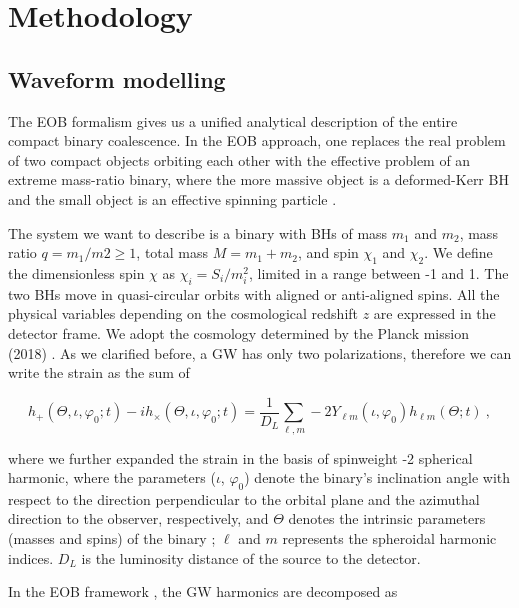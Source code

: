 \section{Methodology} 

\subsection{Waveform modelling}
\label{ssec:Waveform_modelling}


The EOB formalism gives us a unified analytical description of the entire compact binary coalescence. In the EOB approach, one replaces the real problem of two compact objects orbiting each other with the effective problem of an extreme mass-ratio binary, where the more massive object is a deformed-Kerr BH and the small object is an effective spinning particle \cite{Taracchini_2014}.


The system we want to describe is a binary with BHs of mass $m_1$ and $m_2$, mass ratio $q=m_1/m2 \geq 1 $, total mass $M = m_1+m_2$, and spin $\chi_1$ and $\chi_2$. We define the dimensionless spin $\chi$ as $\chi_i = S_i/m_i^2$, limited in a range between -1 and 1. The two BHs move in quasi-circular orbits with aligned or anti-aligned spins. All the physical variables depending on the cosmological redshift $z$ are expressed in the detector frame. We adopt the cosmology determined by the Planck mission (2018) \cite{2020}.
As we clarified before, a GW has only two polarizations, therefore we can write the strain as the sum of 

\begin{equation}
	h_+( \Theta, \iota, \varphi_0; t) - i h_\times( \Theta, \iota, \varphi_0; t) = \frac{1}{D_L} \sum_{\ell,m} -2 Y_{\ell m}(\iota, \varphi_0) h_{\ell m}(\Theta; t) \:,
\end{equation}

\noindent
where we further expanded the strain in the basis of spinweight -2 spherical harmonic, where the parameters ($ \iota $, $\varphi_0$) denote the binary’s inclination angle with respect to the direction perpendicular to the orbital plane and the azimuthal direction to the observer, respectively, and $\Theta$ denotes the intrinsic parameters (masses and
spins) of the binary \cite{toubiana2024measuringsourcepropertiesquasinormalmode}; $\ell$ and $m $ represents the spheroidal harmonic indices. $D_L$ is the luminosity distance of the source to the detector.

In the EOB framework \cite{Buonanno_2000}, the GW harmonics are decomposed as

